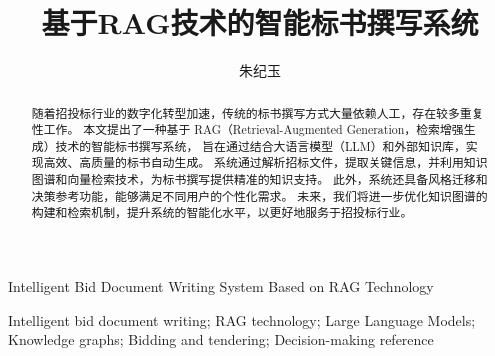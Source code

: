 \documentclass{xmu}
\begin{document}


\design


\title{基于RAG技术的智能标书撰写系统}
{Intelligent Bid Document Writing System Based on RAG Technology}

\author{朱纪玉}



\subject{网络空间安全}





{Intelligent bid document writing; RAG technology; Large Language Models; Knowledge graphs; Bidding and tendering; Decision-making reference}

\maketitle


\begin{abstract}
随着招投标行业的数字化转型加速，传统的标书撰写方式大量依赖人工，存在较多重复性工作。
本文提出了一种基于 RAG（Retrieval-Augmented Generation，检索增强生成）技术的智能标书撰写系统，
旨在通过结合大语言模型（LLM）和外部知识库，实现高效、高质量的标书自动生成。
系统通过解析招标文件，提取关键信息，并利用知识图谱和向量检索技术，为标书撰写提供精准的知识支持。
此外，系统还具备风格迁移和决策参考功能，能够满足不同用户的个性化需求。
未来，我们将进一步优化知识图谱的构建和检索机制，提升系统的智能化水平，以更好地服务于招投标行业。
\end{abstract}
\end{document}
